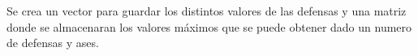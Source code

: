 
Se crea un vector para guardar los distintos valores de las defensas y una matriz donde se almacenaran los valores máximos que se puede obtener dado un numero de defensas y ases.


